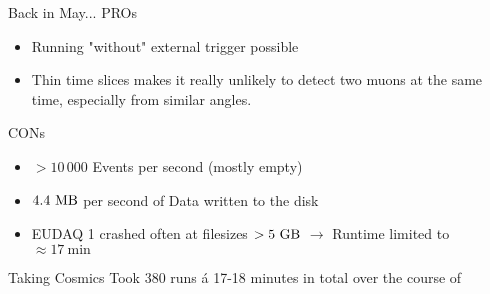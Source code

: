 \documentclass{beamer}
\begin{document}
\begin{frame}{Back in May...}
    \Large PROs \footnotesize \\
    \begin{itemize}
	\item Running "without" external trigger possible
	\item Thin time slices makes it really unlikely to detect
	    two muons at the same time, especially from similar angles.
    \end{itemize}
    \Large CONs \footnotesize 
    \begin{itemize}
	\item $> 10 \, 000$ Events per second (mostly empty)
	\item $4.4 \ \si{\mega \byte}$ per second of Data written to the disk
	\item EUDAQ 1 crashed often at filesizes \( > 5 \ \si{\giga \byte} \)
	    $\rightarrow$ Runtime limited to \( \approx 17 \ \si{\minute} \) 
    \end{itemize}
\end{frame}

\begin{frame}{Taking Cosmics}
    Took 380 runs á 17-18 minutes in total over the course of
\end{frame}
\end{document}
